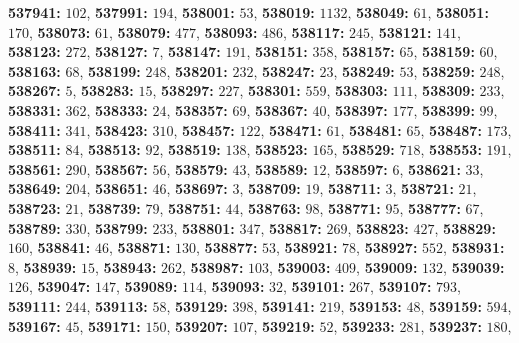 \textsf{\bfseries 537941:} $102$, \textsf{\bfseries 537991:} $194$, \textsf{\bfseries 538001:} $53$, \textsf{\bfseries 538019:} $1132$, \textsf{\bfseries 538049:} $61$, \textsf{\bfseries 538051:} $170$, \textsf{\bfseries 538073:} $61$, \textsf{\bfseries 538079:} $477$, \textsf{\bfseries 538093:} $486$, \textsf{\bfseries 538117:} $245$, \textsf{\bfseries 538121:} $141$, \textsf{\bfseries 538123:} $272$, \textsf{\bfseries 538127:} $7$, \textsf{\bfseries 538147:} $191$, \textsf{\bfseries 538151:} $358$, \textsf{\bfseries 538157:} $65$, \textsf{\bfseries 538159:} $60$, \textsf{\bfseries 538163:} $68$, \textsf{\bfseries 538199:} $248$, \textsf{\bfseries 538201:} $232$, \textsf{\bfseries 538247:} $23$, \textsf{\bfseries 538249:} $53$, \textsf{\bfseries 538259:} $248$, \textsf{\bfseries 538267:} $5$, \textsf{\bfseries 538283:} $15$, \textsf{\bfseries 538297:} $227$, \textsf{\bfseries 538301:} $559$, \textsf{\bfseries 538303:} $111$, \textsf{\bfseries 538309:} $233$, \textsf{\bfseries 538331:} $362$, \textsf{\bfseries 538333:} $24$, \textsf{\bfseries 538357:} $69$, \textsf{\bfseries 538367:} $40$, \textsf{\bfseries 538397:} $177$, \textsf{\bfseries 538399:} $99$, \textsf{\bfseries 538411:} $341$, \textsf{\bfseries 538423:} $310$, \textsf{\bfseries 538457:} $122$, \textsf{\bfseries 538471:} $61$, \textsf{\bfseries 538481:} $65$, \textsf{\bfseries 538487:} $173$, \textsf{\bfseries 538511:} $84$, \textsf{\bfseries 538513:} $92$, \textsf{\bfseries 538519:} $138$, \textsf{\bfseries 538523:} $165$, \textsf{\bfseries 538529:} $718$, \textsf{\bfseries 538553:} $191$, \textsf{\bfseries 538561:} $290$, \textsf{\bfseries 538567:} $56$, \textsf{\bfseries 538579:} $43$, \textsf{\bfseries 538589:} $12$, \textsf{\bfseries 538597:} $6$, \textsf{\bfseries 538621:} $33$, \textsf{\bfseries 538649:} $204$, \textsf{\bfseries 538651:} $46$, \textsf{\bfseries 538697:} $3$, \textsf{\bfseries 538709:} $19$, \textsf{\bfseries 538711:} $3$, \textsf{\bfseries 538721:} $21$, \textsf{\bfseries 538723:} $21$, \textsf{\bfseries 538739:} $79$, \textsf{\bfseries 538751:} $44$, \textsf{\bfseries 538763:} $98$, \textsf{\bfseries 538771:} $95$, \textsf{\bfseries 538777:} $67$, \textsf{\bfseries 538789:} $330$, \textsf{\bfseries 538799:} $233$, \textsf{\bfseries 538801:} $347$, \textsf{\bfseries 538817:} $269$, \textsf{\bfseries 538823:} $427$, \textsf{\bfseries 538829:} $160$, \textsf{\bfseries 538841:} $46$, \textsf{\bfseries 538871:} $130$, \textsf{\bfseries 538877:} $53$, \textsf{\bfseries 538921:} $78$, \textsf{\bfseries 538927:} $552$, \textsf{\bfseries 538931:} $8$, \textsf{\bfseries 538939:} $15$, \textsf{\bfseries 538943:} $262$, \textsf{\bfseries 538987:} $103$, \textsf{\bfseries 539003:} $409$, \textsf{\bfseries 539009:} $132$, \textsf{\bfseries 539039:} $126$, \textsf{\bfseries 539047:} $147$, \textsf{\bfseries 539089:} $114$, \textsf{\bfseries 539093:} $32$, \textsf{\bfseries 539101:} $267$, \textsf{\bfseries 539107:} $793$, \textsf{\bfseries 539111:} $244$, \textsf{\bfseries 539113:} $58$, \textsf{\bfseries 539129:} $398$, \textsf{\bfseries 539141:} $219$, \textsf{\bfseries 539153:} $48$, \textsf{\bfseries 539159:} $594$, \textsf{\bfseries 539167:} $45$, \textsf{\bfseries 539171:} $150$, \textsf{\bfseries 539207:} $107$, \textsf{\bfseries 539219:} $52$, \textsf{\bfseries 539233:} $281$, \textsf{\bfseries 539237:} $180$, 
